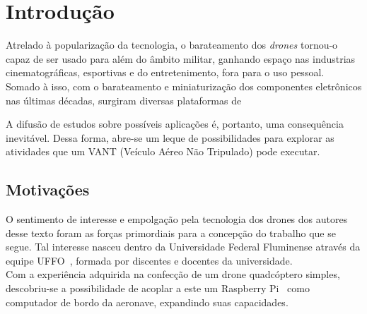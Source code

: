 \documentclass[12pt,a4paper,oneside]{book}
\begin{document}
\clearpage



%




\chapter{Introdução}
%
\thispagestyle{empty} 
%
%
Atrelado à popularização da tecnologia, o barateamento dos \textit{drones} tornou-o capaz de ser usado para além do âmbito militar, ganhando espaço nas industrias cinematográficas, esportivas e do entretenimento, fora para o uso pessoal.\\

Somado à isso, com o barateamento e miniaturização dos componentes eletrônicos nas últimas décadas, surgiram diversas plataformas de 

A difusão de estudos sobre possíveis aplicações é, portanto, uma consequência inevitável. Dessa forma, abre-se um leque de possibilidades para explorar as atividades que um VANT (Veículo Aéreo Não Tripulado) pode executar.\\



\section{Motivações}

O sentimento de interesse e empolgação pela tecnologia dos drones dos autores desse texto foram as forças primordiais para a concepção do trabalho que se segue. Tal interesse nasceu dentro da Universidade Federal Fluminense através da equipe UFFO~\cite{url:equipeuffo}, formada por discentes e docentes da universidade.\\

Com a experiência adquirida na confecção de um drone quadcóptero simples, descobriu-se a possibilidade de acoplar a este um Raspberry Pi~\cite{url:raspberrypi} como computador de bordo da aeronave, expandindo suas capacidades.\\
\end{document}
